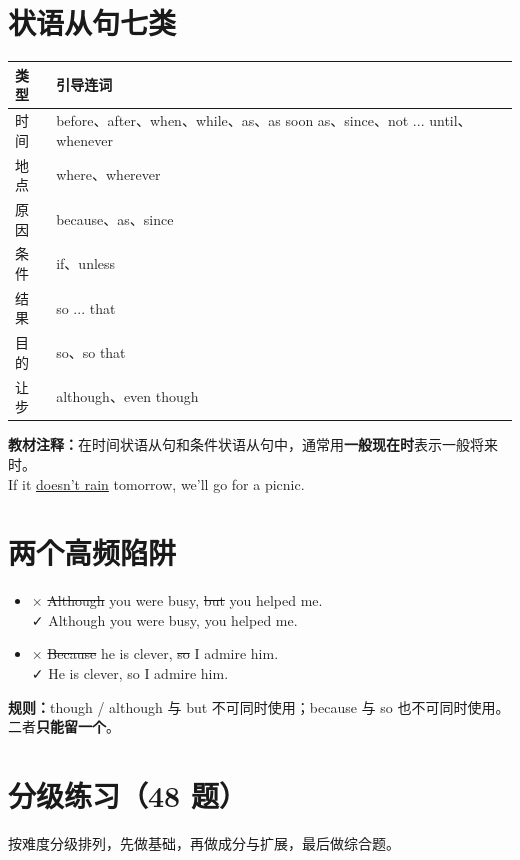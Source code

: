 \documentclass[11pt,a4paper]{ctexart}
\begin{document}
\section{状语从句七类}
\begin{center}
\begin{tabular}{p{2.2cm}p{11.6cm}}
\hline
\textbf{类型} & \textbf{引导连词}\\
\hline
时间 & before、after、when、while、as、as soon as、since、not ... until、whenever\\
地点 & where、wherever\\
原因 & because、as、since\\
条件 & if、unless\\
结果 & so ... that\\
目的 & so、so that\\
让步 & although、even though\\
\hline
\end{tabular}
\end{center}
\textbf{教材注释：}在时间状语从句和条件状语从句中，通常用\textbf{一般现在时}表示一般将来时。\\
\quad If it \underline{doesn't rain} tomorrow, we'll go for a picnic.

\section{两个高频陷阱}
\begin{itemize}[leftmargin=1.4em]
\item × \sout{Although} you were busy, \sout{but} you helped me.\\
\quad ✓ Although you were busy, you helped me.
\item × \sout{Because} he is clever, \sout{so} I admire him.\\
\quad ✓ He is clever, so I admire him.
\end{itemize}
\textbf{规则：}though / although 与 but 不可同时使用；because 与 so 也不可同时使用。二者\textbf{只能留一个}。


\newpage
\section{分级练习（48 题）}
\noindent 按难度分级排列，先做基础，再做成分与扩展，最后做综合题。
\end{document}
